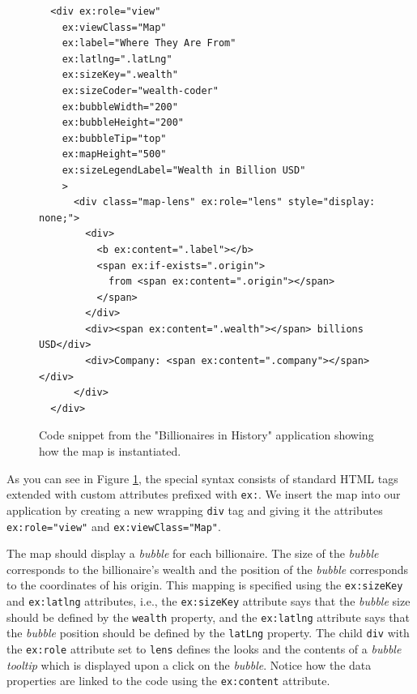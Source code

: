 \begin{figure}
\centering

  \begin{verbatim}
  <div ex:role="view"
    ex:viewClass="Map"
    ex:label="Where They Are From"
    ex:latlng=".latLng"
    ex:sizeKey=".wealth"
    ex:sizeCoder="wealth-coder"
    ex:bubbleWidth="200"
    ex:bubbleHeight="200"
    ex:bubbleTip="top"
    ex:mapHeight="500"
    ex:sizeLegendLabel="Wealth in Billion USD"
    >
      <div class="map-lens" ex:role="lens" style="display: none;">
        <div>
          <b ex:content=".label"></b>
          <span ex:if-exists=".origin">
          	from <span ex:content=".origin"></span>
          </span>
        </div>
        <div><span ex:content=".wealth"></span> billions USD</div>
        <div>Company: <span ex:content=".company"></span></div>
      </div>
  </div>
  \end{verbatim}  
  \caption{Code snippet from the "Billionaires in History" application \cite{exhibit_example} showing how the map is instantiated.}
  \label{fig:exhibit-map-code-snippet}
\end{figure}

As you can see in Figure \ref{fig:exhibit-map-code-snippet}, the special syntax consists of standard HTML tags extended with custom attributes prefixed with \texttt{ex:}. We insert the map into our application by creating a new wrapping \texttt{div} tag and giving it the attributes \texttt{ex:role="view"} and \texttt{ex:viewClass="Map"}. 

The map should display a \emph{bubble} for each billionaire. The size of the \emph{bubble} corresponds to the billionaire's wealth and the position of the \emph{bubble} corresponds to the coordinates of his origin. This mapping is specified using the \texttt{ex:sizeKey} and \texttt{ex:latlng} attributes, i.e., the \texttt{ex:sizeKey} attribute says that the \emph{bubble} size should be defined by the \texttt{wealth} property, and the \texttt{ex:latlng} attribute says that the \emph{bubble} position should be defined by the \texttt{latLng} property. The child \texttt{div} with the \texttt{ex:role} attribute set to \texttt{lens} defines the looks and the contents of a \emph{bubble tooltip}  which is displayed upon a click on the \emph{bubble}. Notice how the data properties are linked to the code using the \texttt{ex:content} attribute. 

